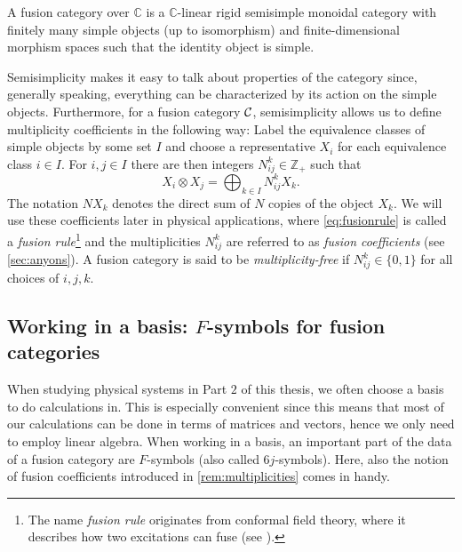 	\begin{defn}
		\label{def:fusioncat}
		A fusion category over $\mathbb{C}$ is a $\mathbb{C}$-linear rigid semisimple monoidal category with finitely many simple objects (up to isomorphism) and finite-dimensional morphism spaces such that the identity object is simple.
	\end{defn}

	\begin{rem}
		\label{rem:multiplicities}
		Semisimplicity makes it easy to talk about properties of the category since, generally speaking, everything can be characterized by its action on the simple objects. Furthermore, for a fusion category ${\mathcal{C}}$, semisimplicity allows us to define multiplicity coefficients in the following way: Label the equivalence classes of simple objects by some set $I$ and choose a representative $X_i$ for each equivalence class $i\in I$. For $i,j\in I$ there are then integers $N_{ij}^k\in\mathbb{Z}_+$ such that
			\begin{equation}
				\label{eq:fusionrule}
				X_i\otimes X_j=\bigoplus_{k\in I} N_{ij}^k X_k.
			\end{equation}
		The notation $N X_k$ denotes the direct sum of $N$ copies of the object $X_k$. We will use these coefficients later in physical applications, where \cref{eq:fusionrule} is called a \emph{fusion rule}\footnote{The name \emph{fusion rule} originates from conformal field theory, where it describes how two excitations can fuse (see \cite{Verlinde1988}).} and the multiplicities $N_{ij}^k$ are referred to as \emph{fusion coefficients} (see \cref{sec:anyons}). A fusion category is said to be \emph{multiplicity-free} if $N_{ij}^k\in\{0,1\}$ for all choices of $i,j,k$.
	\end{rem}

\subsection*{Working in a basis: $F$-symbols for fusion categories}

When studying physical systems in Part $2$ of this thesis, we often choose a basis to do calculations in. This is especially convenient since this means that most of our calculations can be done in terms of matrices and vectors, hence we only need to employ linear algebra. When working in a basis, an important part of the data of a fusion category are $F$-symbols (also called $6j$-symbols). Here, also the notion of fusion coefficients introduced in \cref{rem:multiplicities} comes in handy.

